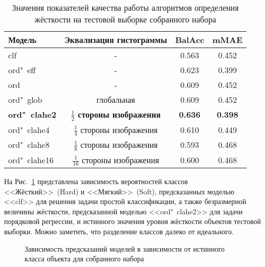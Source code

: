 \begin{table} [htbp]%
	\centering
	\caption{Значения показателей качества работы алгоритмов определения жёсткости на тестовой выборке собранного набора}%
	\label{tab:hardness-metrics-test}%
	\renewcommand{\arraystretch}{1.5}%
	\begin{SingleSpace}
		\begin{tabular}{@{}@{\extracolsep{20pt}}lccc@{}} %
			\toprule     %
			Модель & Эквализация гистограммы & BalAcc & mMAE \\
			\midrule %
			clf	& - & 0.563 & 0.452 \\
			ord"~eff & - & 0.623 & 0.399 \\
			ord & - & 0.609 & 0.452 \\
			ord"~glob & глобальная & 0.609 & 0.452 \\
			\textbf{ord"~clahe2} & \textbf{$\frac{1}{2}$ стороны изображения} & \textbf{0.636} & \textbf{0.398} \\
			ord"~clahe4 & $\frac{1}{4}$ стороны изображения	& 0.610 & 0.449 \\
			ord"~clahe8 & $\frac{1}{8}$ стороны изображения	& 0.593 & 0.468 \\
			ord"~clahe16 & $\frac{1}{16}$ стороны изображения & 0.600 & 0.468 \\
			\bottomrule %
		\end{tabular}%
	\end{SingleSpace}
\end{table}

На Рис.~\ref{fig:hardness-class-separation} представлена зависимость вероятностей классов <<Жёсткий>>~(Hard) и <<Мягкий>>~(Soft), предсказанных моделью <<clf>> для решения задачи простой классификации, а также безразмерной величины жёсткости, предсказанной моделью <<ord"~clahe2>> для задачи порядковой регрессии, и истинного значения уровня жёсткости объектов тестовой выборки. Можно заметить, что разделение классов далеко от идеального.

\begin{figure}[ht]
	\caption{Зависимость предсказаний моделей в зависимости от истинного класса объекта для собранного набора}
	\label{fig:hardness-class-separation}
\end{figure}


